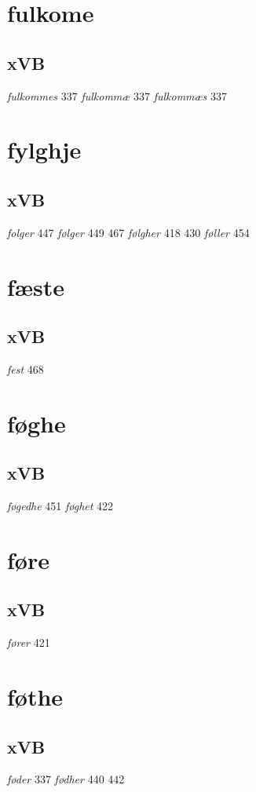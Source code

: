 \documentclass[a4paper,twocolumn]{article}
\begin{document}
\section{fulkome}
\label{sec:orgea7da97}
\subsection{xVB}
\label{sec:orgbb69169}
\emph{fulkommes} 337 \emph{fulkommæ} 337 \emph{fulkommæs} 337 
\section{fylghje}
\label{sec:org6a1902d}
\subsection{xVB}
\label{sec:orgee18f28}
\emph{folger} 447 \emph{følger} 449 467 \emph{følgher} 418 430 \emph{føller} 454 
\section{fæste}
\label{sec:org6badd14}
\subsection{xVB}
\label{sec:org0816cd6}
\emph{fest} 468 
\section{føghe}
\label{sec:orgea0cc5f}
\subsection{xVB}
\label{sec:orgfec93dc}
\emph{føgedhe} 451 \emph{føghet} 422 
\section{føre}
\label{sec:orgbe8bf48}
\subsection{xVB}
\label{sec:org9e6d0cd}
\emph{fører} 421 
\section{føthe}
\label{sec:orgc2113c2}
\subsection{xVB}
\label{sec:org1ccc34b}
\emph{føder} 337 \emph{fødher} 440 442 
\end{document}
